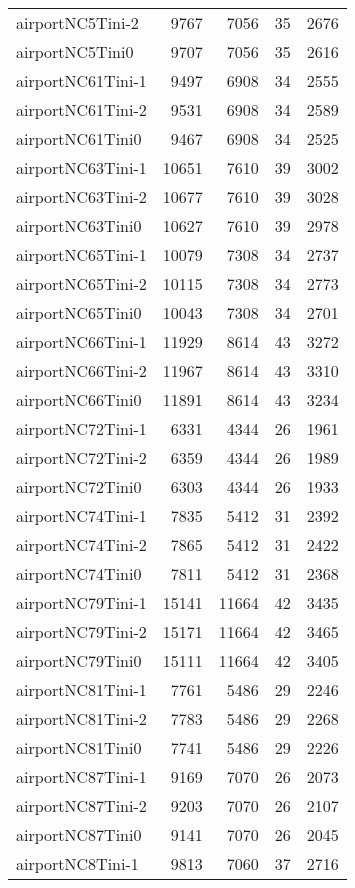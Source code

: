 \begin{longtable}{lrrrr}
airportNC5Tini-2 & 9767 & 7056 & 35 & 2676 \\
airportNC5Tini0 & 9707 & 7056 & 35 & 2616 \\
airportNC61Tini-1 & 9497 & 6908 & 34 & 2555 \\
airportNC61Tini-2 & 9531 & 6908 & 34 & 2589 \\
airportNC61Tini0 & 9467 & 6908 & 34 & 2525 \\
airportNC63Tini-1 & 10651 & 7610 & 39 & 3002 \\
airportNC63Tini-2 & 10677 & 7610 & 39 & 3028 \\
airportNC63Tini0 & 10627 & 7610 & 39 & 2978 \\
airportNC65Tini-1 & 10079 & 7308 & 34 & 2737 \\
airportNC65Tini-2 & 10115 & 7308 & 34 & 2773 \\
airportNC65Tini0 & 10043 & 7308 & 34 & 2701 \\
airportNC66Tini-1 & 11929 & 8614 & 43 & 3272 \\
airportNC66Tini-2 & 11967 & 8614 & 43 & 3310 \\
airportNC66Tini0 & 11891 & 8614 & 43 & 3234 \\
airportNC72Tini-1 & 6331 & 4344 & 26 & 1961 \\
airportNC72Tini-2 & 6359 & 4344 & 26 & 1989 \\
airportNC72Tini0 & 6303 & 4344 & 26 & 1933 \\
airportNC74Tini-1 & 7835 & 5412 & 31 & 2392 \\
airportNC74Tini-2 & 7865 & 5412 & 31 & 2422 \\
airportNC74Tini0 & 7811 & 5412 & 31 & 2368 \\
airportNC79Tini-1 & 15141 & 11664 & 42 & 3435 \\
airportNC79Tini-2 & 15171 & 11664 & 42 & 3465 \\
airportNC79Tini0 & 15111 & 11664 & 42 & 3405 \\
airportNC81Tini-1 & 7761 & 5486 & 29 & 2246 \\
airportNC81Tini-2 & 7783 & 5486 & 29 & 2268 \\
airportNC81Tini0 & 7741 & 5486 & 29 & 2226 \\
airportNC87Tini-1 & 9169 & 7070 & 26 & 2073 \\
airportNC87Tini-2 & 9203 & 7070 & 26 & 2107 \\
airportNC87Tini0 & 9141 & 7070 & 26 & 2045 \\
airportNC8Tini-1 & 9813 & 7060 & 37 & 2716 \\

\end{longtable}
